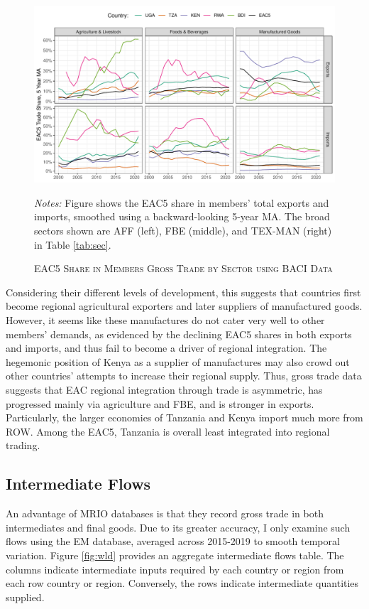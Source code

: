 \documentclass[a4paper]{article}
\begin{document}
\begin{figure}[h!] 
\centering
\caption{\label{fig:GTEACsharesSec}\textsc{EAC5 Share in Members Gross Trade by Sector using BACI Data}}
\includegraphics[width=\textwidth, trim= {0 0 0 0}, clip]{"GT_EAC5_shares_sec_ts.pdf"} \raggedright
\scriptsize 
\emph{Notes:} Figure shows the EAC5 share in members' total exports and imports, smoothed using a backward-looking 5-year MA. The broad sectors shown are AFF (left), FBE (middle), and TEX-MAN (right) in Table \ref{tab:sec}.
\end{figure}
\FloatBarrier

Considering their different levels of development, this suggests that countries first become regional agricultural exporters and later suppliers of manufactured goods. However, it seems like these manufactures do not cater very well to other members' demands, as evidenced by the declining EAC5 shares in both exports and imports, and thus fail to become a driver of regional integration. The hegemonic position of Kenya as a supplier of manufactures may also crowd out other countries' attempts to increase their regional supply. Thus, gross trade data suggests that EAC regional integration through trade is asymmetric, has progressed mainly via agriculture and FBE, and is stronger in exports. Particularly, the larger economies of Tanzania and Kenya import much more from ROW. Among the EAC5, Tanzania is overall least integrated into regional trading. 

\subsection{Intermediate Flows}

An advantage of MRIO databases is that they record gross trade in both intermediates and final goods. Due to its greater accuracy, I only examine such flows using the EM database, averaged across 2015-2019 to smooth temporal variation. Figure \ref{fig:wld} provides an aggregate intermediate flows table. The columns indicate intermediate inputs required by each country or region from each row country or region. Conversely, the rows indicate intermediate quantities supplied. \newline  
\end{document}
